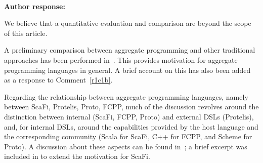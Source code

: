 \documentclass{article}
\newcommand{\reply}[1]{	\\[2pt]
	\textbf{Author response:} 	
	#1
}
\newcommand{\meta}[1]{{\color{blue}#1}}
\begin{document}
\reply{
We believe that a quantitative evaluation and comparison are beyond the scope of this article.

A preliminary comparison between aggregate programming and other traditional approaches has been performed in~\cite{audrito2022ecoop-xc}. This provides motivation for aggregate programming languages in general. A brief account on this has also been added as a response to Comment~\ref{r1c1b}.

Regarding the relationship between aggregate programming languages, namely between ScaFi, Protelis, Proto, FCPP,
 much of the discussion revolves around
 the distinction between internal (ScaFi, FCPP, Proto) and external DSLs (Protelis),
 and, for internal DSLs, around the capabilities provided by the host language and the corresponding community (Scala for ScaFi, C++ for FCPP, and Scheme for Proto).
%
A discussion about these aspects can be found in~\cite{arxiv2020scafi-nc}; a brief excerpt was included in \Cref{main:s:impact} to extend the motivation for ScaFi.
%

%
%
}
\end{document}
